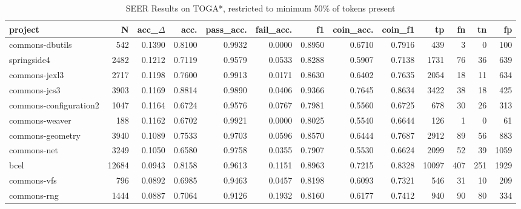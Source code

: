 \begin{table*}
\centering
\caption{SEER Results on TOGA*, restricted to minimum 50\% of tokens present}
\label{tab:toga_results_50}
\begin{tabular}{lrrrrrrrrrrrr}
\toprule
                project &       N &  acc\_$\Delta$ &    acc. &  pass\_acc. &  fail\_acc. &      f1 &  coin\_acc. &  coin\_f1 &      tp &    fn &   tn &     fp \\
\midrule
        commons-dbutils &     542 &      0.1390 &  0.8100 &     0.9932 &     0.0000 &  0.8950 &     0.6710 &   0.7916 &     439 &     3 &    0 &    100 \\
            springside4 &    2482 &      0.1212 &  0.7119 &     0.9579 &     0.0533 &  0.8288 &     0.5907 &   0.7138 &    1731 &    76 &   36 &    639 \\
          commons-jexl3 &    2717 &      0.1198 &  0.7600 &     0.9913 &     0.0171 &  0.8630 &     0.6402 &   0.7635 &    2054 &    18 &   11 &    634 \\
           commons-jcs3 &    3903 &      0.1169 &  0.8814 &     0.9890 &     0.0406 &  0.9366 &     0.7645 &   0.8634 &    3422 &    38 &   18 &    425 \\
 commons-configuration2 &    1047 &      0.1164 &  0.6724 &     0.9576 &     0.0767 &  0.7981 &     0.5560 &   0.6725 &     678 &    30 &   26 &    313 \\
         commons-weaver &     188 &      0.1162 &  0.6702 &     0.9921 &     0.0000 &  0.8025 &     0.5540 &   0.6644 &     126 &     1 &    0 &     61 \\
       commons-geometry &    3940 &      0.1089 &  0.7533 &     0.9703 &     0.0596 &  0.8570 &     0.6444 &   0.7687 &    2912 &    89 &   56 &    883 \\
            commons-net &    3249 &      0.1050 &  0.6580 &     0.9758 &     0.0355 &  0.7907 &     0.5530 &   0.6624 &    2099 &    52 &   39 &   1059 \\
                   bcel &   12684 &      0.0943 &  0.8158 &     0.9613 &     0.1151 &  0.8963 &     0.7215 &   0.8328 &   10097 &   407 &  251 &   1929 \\
            commons-vfs &     796 &      0.0892 &  0.6985 &     0.9463 &     0.0457 &  0.8198 &     0.6093 &   0.7321 &     546 &    31 &   10 &    209 \\
            commons-rng &    1444 &      0.0887 &  0.7064 &     0.9126 &     0.1932 &  0.8160 &     0.6177 &   0.7412 &     940 &    90 &   80 &    334 \\

\end{tabular}
\end{table*}
